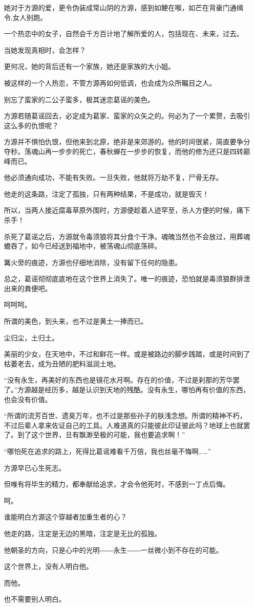 \begin{this_body}
她对于方源的爱，更令伪装成常山阴的方源，感到如鲠在喉，如芒在背豪门通缉令,女人别跑。

一个热恋中的女子，自然会千方百计地了解所爱的人，包括现在、未来，过去。

当她发现真相时，会怎样？

更何况，她的背后还有一个家族，她还是家族的大小姐。

被这样的一个人热恋，不管方源再如何低调，也会成为众所瞩目之人。

别忘了蛮家的二公子蛮多，极其迷恋葛谣的美色。

方源若随葛谣回去，必定成为葛家、蛮家的众矢之的。何必为了一个累赘，去吸引这么多的仇恨呢？

方源并不惧怕仇恨，但他来到北原，绝非是来郊游的。他的时间很紧，简直要争分夺秒。荡魂山再一步步的死亡，春秋蝉在一步步的恢复，而他的修为还只是四转巅峰而已。

他必须通向成功，不能有失败。一旦失败，他就将万劫不复，尸骨无存。

他走的这条路，注定了孤独，只有两种结果，不是成功，就是毁灭！

所以，当两人接近腐毒草原外围时，方源便趁着人迹罕至，杀人方便的时候，痛下杀手！

杀死了葛谣之后，方源就令毒须狼将其分食个干净。魂魄当然也不会放过，用葬魂蟾吞了，如今已经送到福地中，被荡魂山彻底荡碎。

篝火旁的痕迹，方源也仔细地消除，没有留下任何的隐患。

总之，葛谣彻彻底底地在这个世界上消失了。唯一的痕迹，恐怕就是毒须狼群排泄出来的粪便吧。

呵呵呵。

所谓的美色，到头来，也不过是黄土一捧而已。

尘归尘，土归土。

美丽的少女，在天地中，不过和鲜花一样。或是被路边的脚步践踏，或是时间到了枯萎老去，成为丑陋的肥料滋润土地。

“没有永生，再美好的东西也是镜花水月啊。存在的价值，不过是刹那的芳华罢了。”方源越是经历多，越是认识到天地的残酷。没有永生，哪怕再有价值的东西，也会没有价值。

“所谓的流芳百世、遗臭万年，也不过是那些孙子的肤浅念想。所谓的精神不朽，不过后辈人拿来佐证自己的工具。人难道真的只能彼此印证彼此吗？地球上也就罢了。到了这个世界，旦有飘渺至极的可能，我也要追求啊！”

“哪怕死在追求的路上，死得比葛谣难看千万倍，我也丝毫不悔啊……”

方源早已心生死志。

但唯有将毕生的精力，都奉献给追求，才会令他死时，不感到一丁点后悔。

呵。

谁能明白方源这个穿越者加重生者的心？

他走的路，注定是无边的黑暗，注定是无比的孤独。

他朝圣的方向，只是心中的光明――永生――一丝微小到不存在的可能。

这个世界上，没有人明白他。

而他。

也不需要别人明白。

\end{this_body}

